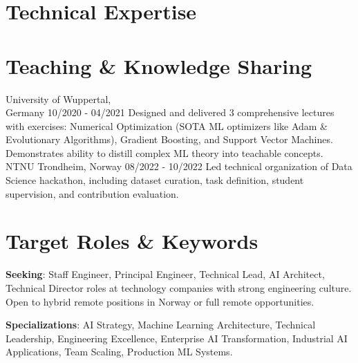 \documentclass[singlesided,
               paper=a4,
               fontsize=10pt
              ]{my-resume}
\begin{document}
\section[\faFlask]{Technical Expertise}

\section[\faBook]{Teaching \& Knowledge Sharing}
    {University of Wuppertal,\\ Germany}
    {10/2020 - 04/2021}
    {
        Designed and delivered 3 comprehensive lectures with exercises: Numerical Optimization (SOTA ML optimizers like Adam \& Evolutionary Algorithms), Gradient Boosting, and Support Vector Machines. Demonstrates ability to distill complex ML theory into teachable concepts.
    }
%
	{NTNU Trondheim, Norway}
	{08/2022 - 10/2022}
    {
        Led technical organization of Data Science hackathon, including dataset curation, task definition, student supervision, and contribution evaluation.
    }

\section[\faGears]{Target Roles \& Keywords}
\textbf{Seeking}: Staff Engineer, Principal Engineer, Technical Lead, AI Architect, Technical Director roles at technology companies with strong engineering culture. Open to hybrid remote positions in Norway or full remote opportunities.

\textbf{Specializations}: AI Strategy, Machine Learning Architecture, Technical Leadership, Engineering Excellence, Enterprise AI Transformation, Industrial AI Applications, Team Scaling, Production ML Systems.
\end{document}
